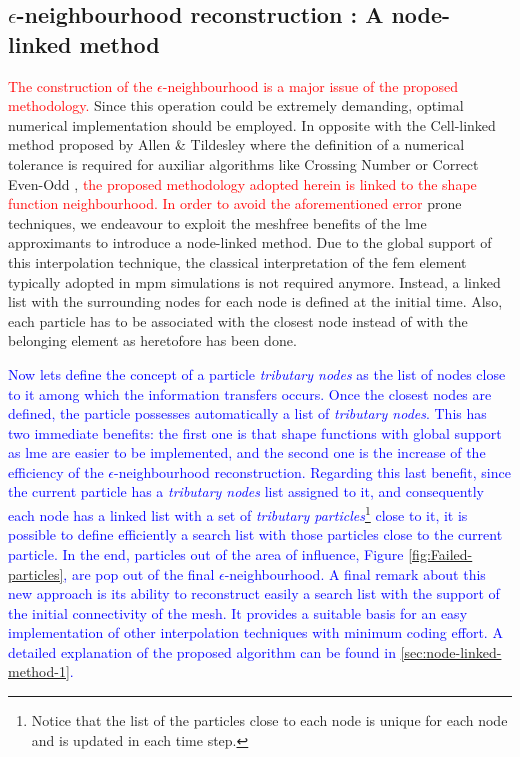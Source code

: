 \documentclass[preprint,12pt,a4paper]{elsarticle}
\newcommand{\PNA}[1]{
  \textcolor{red}{{#1}}
}
\newcommand{\MMP}[1]{
  \textcolor{blue}{{#1}}
}
\begin{document}
\subsection{$\epsilon$-neighbourhood reconstruction : A node-linked method}
\label{sec:epsil-neighb-reconst}
\PNA{The construction of the $\epsilon$-neighbourhood is a major issue of the proposed methodology.} Since this operation could be extremely demanding, optimal
numerical implementation should be employed. In opposite with the Cell-linked
method proposed by Allen \& Tildesley \cite{Allen_et_al_1989} where
the definition of a numerical tolerance is required for auxiliar
algorithms like Crossing Number \cite{Shimrat_1962} or Correct
Even-Odd \cite{Galetzka_et_al_2017}, \PNA{the proposed methodology adopted herein is linked to the shape function neighbourhood. In order to avoid the aforementioned error} prone
techniques, we endeavour to exploit the meshfree benefits of
the \acrshort{lme} approximants to introduce a node-linked method. Due
to the global support of this interpolation technique, the classical
interpretation of the \acrshort{fem} element typically adopted in
\acrshort{mpm} simulations is not required anymore. Instead, a linked
list with the surrounding nodes for each node is defined at the initial
time. Also, each particle has to be associated with the
closest node instead of with the belonging element as heretofore has been
done.
\MMP{Now lets define the concept of a particle \textit{tributary nodes} as the
list of nodes close to it among which the information transfers
occurs. Once the closest nodes are defined, the particle
possesses automatically a list of \textit{tributary nodes}. This has two
immediate benefits: the first one is that shape functions with global
support as \acrshort{lme} are easier to be implemented,
and the second one is the increase of the efficiency of the $\epsilon$-neighbourhood
reconstruction. Regarding this last benefit, since the current
particle has a \textit{tributary nodes} list assigned to it, and
consequently each node has a linked list with a set of
\textit{tributary particles}\footnote{Notice that the list of the
  particles close to each node is unique for each node and is updated
  in each time step.} close to it, it is possible to define efficiently a
search list with those particles close to the current particle.
In the end, particles out of the area of influence, Figure
\ref{fig:Failed-particles}, are pop out of the final
$\epsilon$-neighbourhood. A final remark about this new approach is
its ability to reconstruct easily a search list with the support of
the initial connectivity of the mesh. It provides a suitable basis for
an easy implementation of other interpolation techniques with minimum
coding effort. A detailed explanation of the proposed algorithm can be
found in \ref{sec:node-linked-method-1}.}
\end{document}
